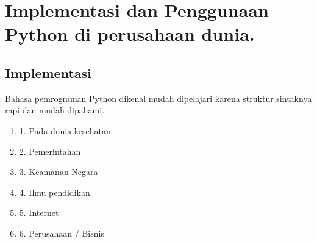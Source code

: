 \section{Implementasi dan Penggunaan Python di perusahaan dunia.}
\subsection{Implementasi}
Bahasa pemrograman Python dikenal mudah dipelajari karena struktur sintaknya rapi dan mudah dipahami. 
\begin{enumerate}
\item 1. Pada dunia kesehatan 
\item 2. Pemerintahan
\item 3. Keamanan Negara
\item 4. Ilmu pendidikan
\item 5. Internet
\item 6. Perusahaan / Bisnis
\end{enumerate}

